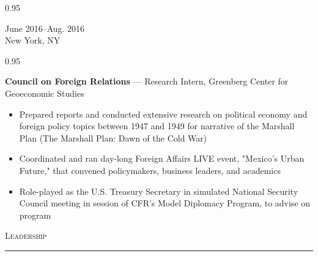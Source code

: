\documentclass[a4paper,9pt]{article}
\newcommand{\mainMarginBottom}{\vspace*{1.5pt}}
\newcommand{\newLine}{\\}
\newcommand{\doubleColumnGap}{\hspace{4mm}}
\newcommand{\sectionMarginTopBottom}{\vspace*{7.5pt}}
\newcommand{\sectionMarginBetweenRemove}{\vspace{-5ex}}
\newcommand{\sectionMarginBetweenAdd}{\vspace{20pt}}
\newcommand{\mainLineSpacing}{0.95}
\begin{document}
\begin{minipage}[t]{0.20\linewidth}
	\begin{small}
		\begin{spacing}\mainLineSpacing{}
			\begin{flushright}
				June 2016--Aug. 2016
				\newLine{}
				\mainMarginBottom{}
				New York, NY
			\end{flushright}
		\end{spacing}
	\end{small}
\end{minipage}
\doubleColumnGap{}
\begin{minipage}[t]{0.75\linewidth}
	\begin{small}
		\begin{spacing}\mainLineSpacing{}
			\begin{flushleft}
				\textbf{Council on Foreign Relations} --- Research Intern, Greenberg Center for Geoeconomic Studies
				\mainMarginBottom{}
				\begin{itemize}[itemsep=0pt,topsep=0pt,leftmargin=*]
					\item Prepared reports and conducted extensive research on political economy and foreign policy topics between 1947 and 1949 for narrative of the Marshall Plan (The Marshall Plan: Dawn of the Cold War)
					\item Coordinated and ran day-long Foreign Affairs LIVE event, "Mexico's Urban Future," that convened policymakers, business leaders, and academics
					\item Role-played as the U.S. Treasury Secretary in simulated National Security Council meeting in session of CFR's Model Diplomacy Program, to advise on program
				\end{itemize}
			\end{flushleft}
		\end{spacing}
	\end{small}
\end{minipage}

\sectionMarginBetweenRemove{}
\sectionMarginBetweenAdd{}

\begin{Large}
	\textsc{Leadership}
\end{Large}
\sectionMarginTopBottom{}
\hrule
\sectionMarginTopBottom{}
\end{document}

